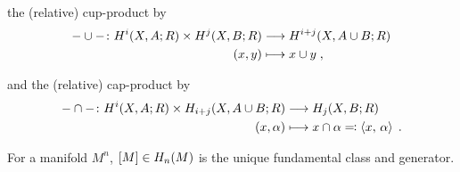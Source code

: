 \begin{compactitemize}[leftmargin=*]
  \begin{compactitemize}
  \item the (relative) cup-product by
    \begin{align*}
      -\cup-\colon
      H^i(X,A;R)\times H^j(X,B;R) &\longrightarrow H^{i+j}(X,A\cup B;R)\\
      (x, y) &\longmapsto x\cup y\;,
    \end{align*}
  \item and the (relative) cap-product by
    \begin{align*}
      -\cap-\colon
      H^i(X,A;R)\times H_{i+j}(X,A\cup B;R) &\longrightarrow H_j(X,B;R)\\
      (x, \alpha) &\longmapsto x\cap \alpha \eqqcolon \left\langle x,\, \alpha \right\rangle
                    \;.
    \end{align*}
  \item For a manifold $M^n$, $[M]\in H_n(M)$ is the unique
    fundamental class and generator.
  \end{compactitemize}
\end{compactitemize}




